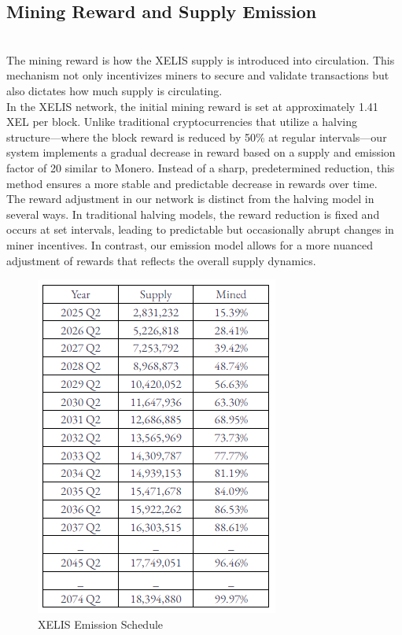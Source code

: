 \documentclass[12pt,a4paper,twocolumn]{article}
\begin{document}
\subsection{Mining Reward and Supply Emission}\\

The mining reward is how the XELIS supply is introduced into circulation. This mechanism not only incentivizes miners to secure and validate transactions but also dictates how much supply is circulating.\\

In the XELIS network, the initial mining reward is set at approximately 1.41 XEL per block. Unlike traditional cryptocurrencies that utilize a halving structure—where the block reward is reduced by 50\% at regular intervals—our system implements a gradual decrease in reward based on a supply and emission factor of 20 similar to Monero. Instead of a sharp, predetermined reduction, this method ensures a more stable and predictable decrease in rewards over time.\\

The reward adjustment in our network is distinct from the halving model in several ways. In traditional halving models, the reward reduction is fixed and occurs at set intervals, leading to predictable but occasionally abrupt changes in miner incentives. In contrast, our emission model allows for a more nuanced adjustment of rewards that reflects the overall supply dynamics.\\

\begin{figure}
    \centering
    \includegraphics[width=0.7\linewidth]{Screenshot 2024-10-23 185252.png}
    \caption{XELIS Emission Schedule}
    \label{fig:enter-label}
\end{figure}
\end{document}

